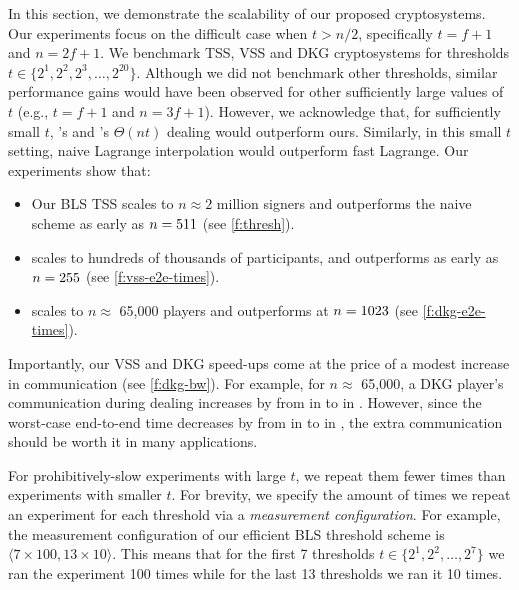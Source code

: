 In this section, we demonstrate the scalability of our proposed cryptosystems.
Our experiments focus on the difficult case when $t > n/2$, specifically $t=f+1$ and $n=2f+1$.
We benchmark TSS, VSS and DKG cryptosystems for thresholds $t \in\{2^1,2^2,2^3,\dots,2^{20}\}$.
Although we did not benchmark other thresholds, similar performance gains would have been observed for other sufficiently large values of $t$ (e.g., $t=f+1$ and $n=3f+1$).
However, we acknowledge that, for sufficiently small $t$, \evss's and \ejfdkg's $\Theta(nt)$ dealing would outperform ours.
Similarly, in this small $t$ setting, naive Lagrange interpolation would outperform fast Lagrange.
Our experiments show that:
\begin{itemize}
    \item Our BLS TSS scales to $n \approx 2$ million signers and outperforms the naive scheme as early as $n=511$ (see \cref{f:thresh}).
    \item \ourvss scales to hundreds of thousands of participants, and outperforms \evss as early as $n=255$ (see \cref{f:vss-e2e-times}).
    \item \ourdkg scales to $n\approx$ 65,000 players and outperforms \ejfdkg at $n=1023$ (see \cref{f:dkg-e2e-times}).
\end{itemize}
Importantly, our VSS and DKG speed-ups come at the price of a modest increase in communication (see \cref{f:dkg-bw}).
For example, for $n\approx$ 65,000, a DKG player's communication during dealing increases by  from  in \ejfdkg to  in \ourdkg.
However, since the worst-case end-to-end time decreases by  from  in \ejfdkg to  in \ourdkg, the extra communication should be worth it in many applications.

For prohibitively-slow experiments with large $t$, we repeat them fewer times than experiments with smaller $t$.
For brevity, we specify the amount of times we repeat an experiment for each threshold via a \textit{measurement configuration}.
For example, the measurement configuration of our efficient BLS threshold scheme is $\langle 7 \times 100, 13 \times 10 \rangle$.
This means that for the first 7 thresholds $t\in\{2^1,2^2,\dots,2^7\}$ we ran the experiment 100 times while for the last 13 thresholds we ran it 10 times.

